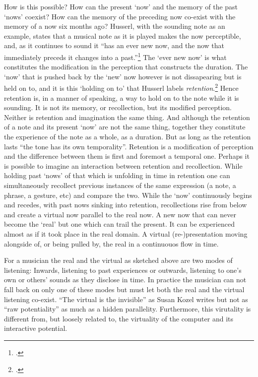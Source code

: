 How is this possible? How can the present `now' and the memory of the past `nows' coexist? How can the memory of the preceding now co-exist with the memory of a now six months ago? Husserl, with the sounding note as an example, states that a musical note as it is played makes the now perceptible, and, as it continues to sound it ``has an ever new now, and the now that immediately preceds it changes into a past.''\footcite[\emph{Vorlesungen zur Phänomenologi des inneren Zeitbewussteins}, Husserl, E. cited in][32]{ricoeur04} The `ever new now' is what constitutes the modification in the perception that constructs the duration. The `now' that is pushed back by the `new' now however is not dissapearing but is held on to, and it is this `holding on to' that Husserl labels \emph{retention}.\footcite[32]{ricoeur04} Hence retention is, in a manner of speaking, a way to hold on to the note while it is sounding. It is not its memory, or recollection, but its modified perception. Neither is retention and imagination the same thing. And although the retention of a note and its present `now' are not the same thing, together they constitute the experience of the note as a whole, as a duration. But as long as the retention lasts ``the tone has its own temporality''. Retention is a modification of perception and the difference between them is first and foremost a temporal one. Perhaps it is possible to imagine an interaction between retention and  recollection. While holding past `nows' of that which is unfolding in time in retention one can simultaneously recollect previous instances of the same expression (a note, a phrase, a gesture, etc) and compare the two. While the `now' continuously begins and recedes, with past nows sinking into retention, recollections rise from below and create a virtual now parallel to the real now. A new now that can never become the `real' but one which can trail the present. It can be experienced almost as if it took place in the real domain. A virtual (re-)presentation moving alongside of, or being pulled by, the real in a continuouos flow in time.

For a musician the real and the virtual as sketched above are two modes of listening: Inwards, listening to past experiences or outwards, listening to one's own or others' sounds as they disclose in time. In practice the musician can not fall back on only one of these modes but must let both the real and the virtual listening co-exist. ``The virtual is the invisible'' as Susan Kozel writes but not as ``raw potentiality'' as much as a hidden parallelity. Furthermore, this virutality is different from, but loosely related to, the virtuality of the computer and its interactive potential. 


